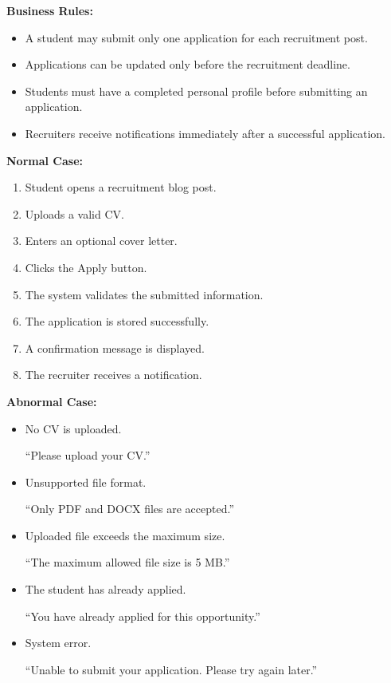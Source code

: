 \vspace{0.2cm}

\textbf{Business Rules:}

\begin{itemize}
    \item A student may submit only one application for each recruitment post.
    \item Applications can be updated only before the recruitment deadline.
    \item Students must have a completed personal profile before submitting an application.
    \item Recruiters receive notifications immediately after a successful application.
\end{itemize}

\vspace{0.2cm}

\textbf{Normal Case:}

\begin{enumerate}
    \item Student opens a recruitment blog post.
    \item Uploads a valid CV.
    \item Enters an optional cover letter.
    \item Clicks the Apply button.
    \item The system validates the submitted information.
    \item The application is stored successfully.
    \item A confirmation message is displayed.
    \item The recruiter receives a notification.
\end{enumerate}

\vspace{0.2cm}

\textbf{Abnormal Case:}

\begin{itemize}
    \item No CV is uploaded.

    ``Please upload your CV.''

    \item Unsupported file format.

    ``Only PDF and DOCX files are accepted.''

    \item Uploaded file exceeds the maximum size.

    ``The maximum allowed file size is 5 MB.''

    \item The student has already applied.

    ``You have already applied for this opportunity.''

    \item System error.

    ``Unable to submit your application. Please try again later.''
\end{itemize}

